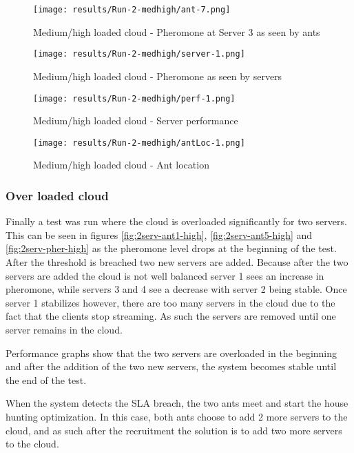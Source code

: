 \begin{figure}
	\centering
		\texttt{[image: results/Run-2-medhigh/ant-7.png]}
	\caption{Medium/high loaded cloud - Pheromone at Server 3 as seen by ants}
	\label{fig:2serv-ant9-medhigh}
\end{figure}

\begin{figure}
	\centering
		\texttt{[image: results/Run-2-medhigh/server-1.png]}
	\caption{Medium/high loaded cloud - Pheromone as seen by servers}
	\label{fig:2serv-pher-medhigh}
\end{figure}

\begin{figure}
	\centering
		\texttt{[image: results/Run-2-medhigh/perf-1.png]}
	\caption{Medium/high loaded cloud - Server performance}
	\label{fig:2serv-perf-medhigh}
\end{figure}

\begin{figure}
	\centering
		\texttt{[image: results/Run-2-medhigh/antLoc-1.png]}
	\caption{Medium/high loaded cloud - Ant location}
	\label{fig:2serv-antloc-medhigh}
\end{figure}

\subsubsection{Over loaded cloud}

Finally a test was run where the cloud is overloaded significantly for two servers. This can be seen in figures \ref{fig:2serv-ant1-high}, \ref{fig:2serv-ant5-high} and \ref{fig:2serv-pher-high} as the pheromone level drops at the beginning of the test. After the threshold is breached two new servers are added. Because after the two servers are added the cloud is not well balanced server 1 sees an increase in pheromone, while servers 3 and 4 see a decrease with server 2 being stable. Once server 1 stabilizes however, there are too many servers in the cloud due to the fact that the clients stop streaming. As such the servers are removed until one server remains in the cloud.

Performance graphs show that the two servers are overloaded in the beginning and after the addition of the two new servers, the system becomes stable until the end of the test.

When the system detects the SLA breach, the two ants meet and start the house hunting optimization. In this case, both ants choose to add 2 more servers to the cloud, and as such after the recruitment the solution is to add two more servers to the cloud.


